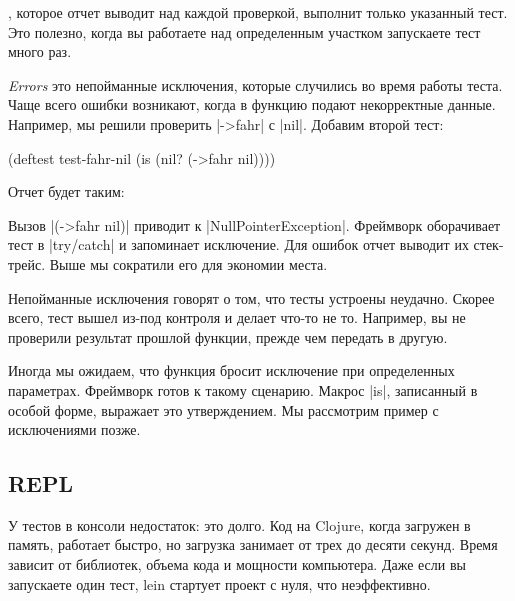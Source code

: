 \noindent
, которое отчет выводит над каждой проверкой, выполнит только указанный
тест. Это полезно, когда вы работаете над определенным участком запускаете тест
много раз.

\emph{Errors} это непойманные исключения, которые случились во время работы
теста. Чаще всего ошибки возникают, когда в функцию подают некорректные
данные. Например, мы решили проверить \spverb|->fahr| с \spverb|nil|. Добавим
второй тест:

\begin{english}
  \begin{clojure}
(deftest test-fahr-nil
  (is (nil? (->fahr nil))))
  \end{clojure}
\end{english}

Отчет будет таким:

\begin{english}
\end{english}

Вызов \spverb|(->fahr nil)| приводит к \spverb|NullPointerException|. Фреймворк
оборачивает тест в \spverb|try/catch| и запоминает исключение. Для ошибок отчет
выводит их стек-трейс. Выше мы сократили его для экономии места.

Непойманные исключения говорят о том, что тесты устроены неудачно. Скорее всего,
тест вышел из-под контроля и делает что-то не то. Например, вы не проверили
результат прошлой функции, прежде чем передать в другую.

Иногда мы ожидаем, что функция бросит исключение при определенных
параметрах. Фреймворк готов к такому сценарию. Макрос \spverb|is|, записанный в
особой форме, выражает это утверждением. Мы рассмотрим пример с исключениями
позже.

\subsection{REPL}

У тестов в консоли недостаток: это долго. Код на Clojure, когда загружен в
память, работает быстро, но загрузка занимает от трех до десяти секунд. Время
зависит от библиотек, объема кода и мощности компьютера. Даже если вы запускаете
один тест, lein стартует проект с нуля, что неэффективно.

